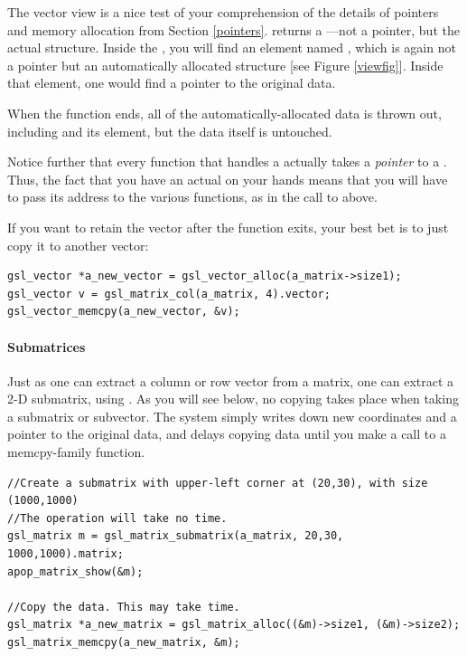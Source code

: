 The vector view is a nice test of your comprehension of the details of
pointers and memory allocation from Section \ref{pointers}.
 returns a
---not a pointer, but the actual
structure.  Inside the , you will find 
an element named , which is again not a pointer but an
automatically allocated structure [see Figure \ref{viewfig}]. Inside that 
element, one would find a pointer to the original data. 

When the function ends, all of the automatically-allocated data is
thrown out, including  and its
 element, but the data itself is untouched.

Notice further that every function that handles a
 actually takes a {\em pointer} to a 
. Thus, the fact that you have an actual 
 on your hands means that you will have to pass
its address to the various functions, as in the call to
 above.

If you want to retain the vector after the function exits, your best bet
is to just copy it to another vector:

\begin{lstlisting}
gsl_vector *a_new_vector = gsl_vector_alloc(a_matrix->size1);
gsl_vector v = gsl_matrix_col(a_matrix, 4).vector;
gsl_vector_memcpy(a_new_vector, &v);
\end{lstlisting}

\paragraph{Submatrices} Just as one can extract a column or row
vector from a matrix, one can extract a 2-D submatrix, using
. As you will see below, no copying takes
place when taking a submatrix or subvector. The system simply writes
down new coordinates and a pointer to the original data, and delays
copying data until you make a call to a {\ci memcpy}-family function. 

\begin{lstlisting}
//Create a submatrix with upper-left corner at (20,30), with size (1000,1000)
//The operation will take no time.
gsl_matrix m = gsl_matrix_submatrix(a_matrix, 20,30, 1000,1000).matrix;
apop_matrix_show(&m);

//Copy the data. This may take time.
gsl_matrix *a_new_matrix = gsl_matrix_alloc((&m)->size1, (&m)->size2);
gsl_matrix_memcpy(a_new_matrix, &m);
\end{lstlisting}

